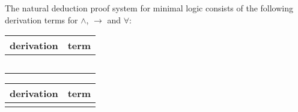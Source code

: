\begin{mydef} 
The natural deduction proof system for minimal logic  consists of the following derivation terms for $\wedge$, $\to$ and $\forall$: 
\begin{center}

\begin{tabular}{| c | c |} \hline
derivation & term \\
\hline 
\raisebox{-1\height}{$u:A$} & \raisebox{-1\height}{$u^A$} \\ [3ex] \hline
\raisebox{-1.2\height}{
\AxiomC{$|M$}
\noLine
\UnaryInfC{$A$}
\AxiomC{$|N$}
\noLine
\UnaryInfC{$B $}
\RightLabel{$\wedge^+$}
\BinaryInfC{$A \wedge B$}
\DisplayProof} &  \raisebox{-2.8\height}{$\langle M^A, N^B \rangle^{A \wedge B}$} \\ [10ex]  \hline
\raisebox{-1.5\height}{
\AxiomC{$|M$}
\noLine
\UnaryInfC{$A \wedge B$}
\RightLabel{$\wedge^-_0$}
\UnaryInfC{$A$}
\DisplayProof \hspace{10pt}
\AxiomC{$|M$}
\noLine
\UnaryInfC{$A \wedge B$}
\RightLabel{$\wedge^-_1$}
\UnaryInfC{$A$}
\DisplayProof} & \raisebox{-2.8\height}{$(M^{A \wedge B} 0)^A \quad (M^{A \wedge B} 1)^B$} \\ [10ex] \hline


\raisebox{-1\height}{
\AxiomC{$\mathass{u: \,A}$}
\noLine
\UnaryInfC{$| \,M$}
\noLine
\UnaryInfC{$B$}
\RightLabel{$\to^+$}
\UnaryInfC{$A \to B$}
\DisplayProof} & \raisebox{-3.2\height}{$(\lambda u^AM^B)^{A \to B}$} \\ [12ex] \hline

\raisebox{-1\height}{
\AxiomC{$|M$}
\noLine
\UnaryInfC{$A \to B$}
\AxiomC{$|N$}
\noLine
\UnaryInfC{$A$}
\RightLabel{$\to^-$}
\BinaryInfC{$B$}
\DisplayProof} & \raisebox{-1.2\height}{$(M^{A \to B} N^{A})^B$} \\ [5ex] \hline


\end{tabular}
\end{center}
\begin{center}
\begin{tabular}{|c|c|} \hline
derivation & term \\ \hline

\raisebox{-1\height}{
\AxiomC{$|M$}
\noLine
\UnaryInfC{$A$}
\RightLabel{$\forall^+x \ (var.cond.)$}
\UnaryInfC{$\forall x A$}
\DisplayProof} & \raisebox{-2.8\height}{$(\lambda x M^A)^{\forall x A} \, (var.cond.)$}  \\ [10ex] \hline


\end{tabular}
\end{center}
\end{mydef}
